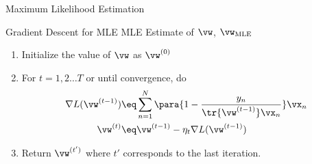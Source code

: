 \documentclass{article}
\begin{document}
\begin{question}
\begin{qsubsection}{Maximum Likelihood Estimation}
\begin{algo}[0.9\textwidth]{Gradient Descent for MLE}
			 MLE Estimate of $\vw$, \ie $\vw_{\text{MLE}}$ \sbr

			\begin{enumerate}
				\item Initialize the value of $\vw$ as $\vw^{(0)}$
				\item For $t = 1, 2 \dots T$ or until convergence, do
					\begin{align*}
						\nabla L(\vw^{(t - 1)})	&\eq	\sum_{n = 1}^N \para{1 - \frac{y_n}{\tr{\vw^{(t - 1)}} \vx_n}} \vx_n \\
						\vw^{(t)}				&\eq	\vw^{(t - 1)} - \eta_t \nabla L(\vw^{(t - 1)})
					\end{align*}
				\item Return $\vw^{(t')}$ where $t'$ corresponds to the last iteration.
			\end{enumerate}

		\end{algo}

	\end{qsubsection}

\end{question}
\end{document}
